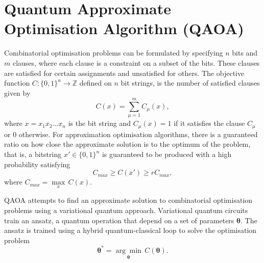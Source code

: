 
\section{Quantum Approximate Optimisation Algorithm (QAOA)} \label{sec:qaoa}
    Combinatorial optimisation problems can be formulated by specifying $n$ bits and $m$ clauses, where each clause is a constraint on a subset of the bits. These clauses are satisfied for certain assignments and unsatisfied for others. The objective function $C:\{0,1\}^n\to\mathbb{Z}$ defined on $n$ bit strings, is the number of satisfied clauses given by 
    \begin{equation}
        C(x) = \sum^m_{\mu=1}C_\mu(x),
    \end{equation}
    where $x=x_1x_2\dots x_n$ is the bit string and $C_\mu(x)=1 $ if it satisfies the clause $C_\mu$ or 0 otherwise. For approximation optimisation algorithms, there is a guaranteed ratio on how close the approximate solution is to the optimum of the problem, that is, a bitstring $x'\in\{0,1\}^n$ is guaranteed to be produced with a high probability satisfying
    \begin{equation}
        C_{max}\geq C(x')\geq rC_{max},
    \end{equation}
    where $C_{max} = \underset{x}{\max}\,C(x)$.

    QAOA attempts to find an approximate solution to combinatorial optimisation problems using a variational quantum approach. Variational quantum circuits train an ansatz, a quantum operation that depend on a set of parameters $\pmb{\theta}$. The ansatz is trained using a hybrid quantum-classical loop to solve the optimisation problem
    \begin{equation}
        \pmb{\theta^*} = \underset{\pmb{\theta}}{\arg\min} \, C(\pmb{\theta}).
    \end{equation}

    
